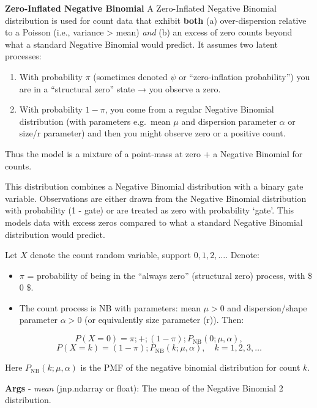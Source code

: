\documentclass[
  letterpaper,
  DIV=11,
  numbers=noendperiod]{scrartcl}
\providecommand{\tightlist}{%
  \setlength{\itemsep}{0pt}\setlength{\parskip}{0pt}}\usepackage{longtable,booktabs,array}
\begin{document}
\textbf{Zero-Inflated Negative Binomial} A Zero-Inflated Negative
Binomial distribution is used for count data that exhibit \textbf{both}
(a) over-dispersion relative to a Poisson (i.e., variance \textgreater{}
mean) \emph{and} (b) an excess of zero counts beyond what a standard
Negative Binomial would predict. It assumes two latent processes:

\begin{enumerate}
\def\labelenumi{\arabic{enumi}.}
\tightlist
\item
  With probability \(\pi\) (sometimes denoted \(\psi\) or
  ``zero-inflation probability'') you are in a ``structural zero'' state
  → you observe a zero.
\item
  With probability \(1 - \pi\), you come from a regular Negative
  Binomial distribution (with parameters e.g.~mean \(\mu\) and
  dispersion parameter \(\alpha\) or size/r parameter) and then you
  might observe zero or a positive count.
\end{enumerate}

Thus the model is a mixture of a point‐mass at zero + a Negative
Binomial for counts.

This distribution combines a Negative Binomial distribution with a
binary gate variable. Observations are either drawn from the Negative
Binomial distribution with probability (1 - gate) or are treated as zero
with probability `gate'. This models data with excess zeros compared to
what a standard Negative Binomial distribution would predict.

Let \(X\) denote the count random variable, support \({0,1,2,\dots}\).
Denote:

\begin{itemize}
\tightlist
\item
  \(\pi\) = probability of being in the ``always zero'' (structural
  zero) process, with \$ 0 \le \pi {}\$.
\item
  The count process is NB with parameters: mean \(\mu>0\) and
  dispersion/shape parameter \(\alpha>0\) (or equivalently size
  parameter (r)). Then:
\end{itemize}

\[
  P(X = 0) = \pi ;+; (1 - \pi); P_{\text{NB}}(0;\mu,\alpha),
  \] \[
  P(X = k) = (1 - \pi); P_{\text{NB}}(k;\mu,\alpha), \quad k = 1,2,3,\dots
  \]

Here \(P_{\text{NB}}(k;\mu,\alpha)\) is the PMF of the negative binomial
distribution for count \(k\).

\textbf{Args} - \emph{mean} (jnp.ndarray or float): The mean of the
Negative Binomial 2 distribution.
\end{document}
